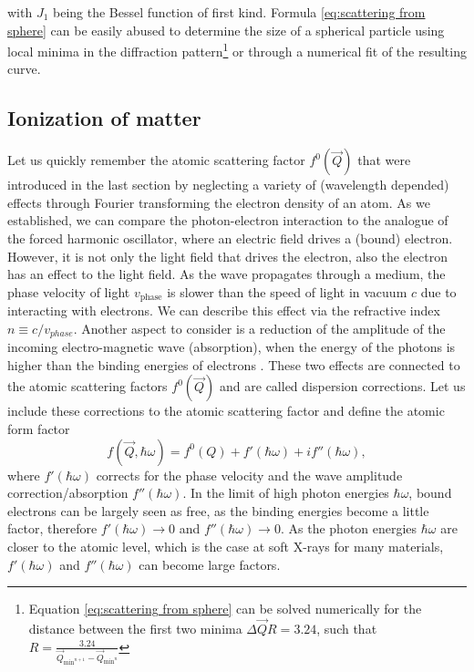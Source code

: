 with $J_{1}$ being the Bessel function of first kind. Formula \eqref{eq:scattering from sphere} can be easily abused to determine the size of a spherical particle using local minima in the diffraction pattern\footnote{Equation \eqref{eq:scattering from sphere} can be solved numerically for the distance between the first two minima $\Delta\vec{Q}R=3.24$, such that $R=\frac{3.24}{\vec{Q}_{\text{min}^{n+1}}-\vec{Q}_{\text{min}^{n}}}$} or through a numerical fit of the resulting curve.
%
%
%
%
%
%
\subsection{Ionization of matter}\label{sec:absorption}
Let us quickly remember the atomic scattering factor $f^{0}\left(\vec{Q}\right)$ that were introduced in the last section by neglecting a variety of (wavelength depended) effects through Fourier transforming the electron density of an atom. As we established, we can compare the photon-electron interaction to the analogue of the forced harmonic oscillator, where an electric field drives a (bound) electron. However, it is not only the light field that drives the electron, also the electron has an effect to the light field. As the wave propagates through a medium, the phase velocity of light $v_{\text{phase}}$ is slower than the speed of light in vacuum $c$ due to interacting with electrons. We can describe this effect via the refractive index $n\equiv c/v_{phase}$. Another aspect to consider is a reduction of the amplitude of the incoming electro-magnetic wave (absorption), when the energy of the photons is higher than the binding energies of electrons \citep{Als-Nielson-2011-JWS,Attwood-2007-CUP}. These two effects are connected to the atomic scattering factors $f^{0}\left(\vec{Q}\right)$ and are called dispersion corrections. Let us include these corrections to the atomic scattering factor and define the atomic form factor
\begin{equation}
f\left(\vec{Q},\hbar\omega\right)=f^{0}\left(Q\right)+f'\left(\hbar\omega\right)+i f''\left(\hbar\omega\right),
\label{eq:scattering-factor-dispersion-corr}
\end{equation}
where $f'\left(\hbar\omega\right)$ corrects for the phase velocity and the wave amplitude correction/absorption $f''\left(\hbar\omega\right)$. In the limit of high photon energies $\hbar \omega$, bound electrons can be largely seen as free, as the binding energies become a little factor, therefore $f'\left(\hbar\omega\right)\rightarrow 0$ and $f''\left(\hbar\omega\right)\rightarrow 0$. As the photon energies $\hbar \omega$ are closer to the atomic level, which is the case at soft X-rays for many materials, $f'\left(\hbar\omega\right)$ and $f''\left(\hbar\omega\right)$ can become large factors.\\
